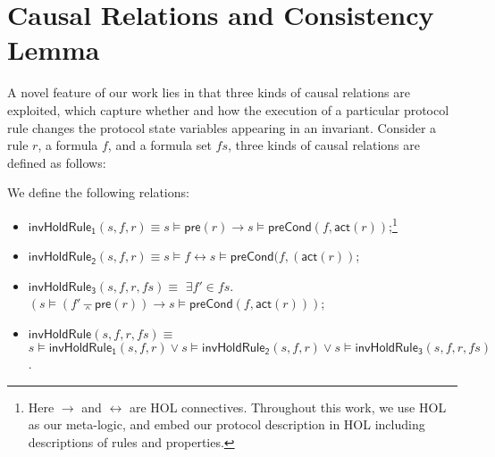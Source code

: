 \documentclass[conference]{IEEEtran}
\newlength{\fminilength}
\newenvironment{fmini}[1][\linewidth]
  {\setlength{\fminilength}{#1\fboxsep-2\fboxrule}%
   \vspace{2ex}\noindent\begin{lrbox}{\fminibox}\begin{minipage}{\fminilength}%
   \mbox{ }\hfill\vspace{-2.5ex}}%
  {\end{minipage}\end{lrbox}\vspace{1ex}\hspace{0ex}%
   \framebox{\usebox{\fminibox}}}
\newenvironment{specification}
{\noindent\scriptsize
\tt\begin{fmini}\begin{tabbing}X\=X12345\=XXXX\=XXXX\=XXXX\=XXXX\=XXXX
\=\+\kill} {\end{tabbing}\normalfont\end{fmini}}
\def \andc {\barwedge }
\begin{document}
{\vspace{-20pt}
\section{Causal Relations and Consistency Lemma} \label{sec:causal_rel}
\vspace{-5pt}
A novel feature of our work lies in that three kinds of causal
relations are exploited, which capture whether and how the execution of a particular protocol rule changes the protocol state variables appearing in an invariant.  Consider a rule $r$, a formula $f$, and a formula set $fs$, three
 kinds of causal relations are defined as follows:

\vspace{-5pt}
\begin{definition}
We define the following relations: %
\begin{itemize}%
\item $\mathsf{invHoldRule_1} (s,f,r) \equiv $$s \models \mathsf{pre}(r) \longrightarrow s \models \mathsf{preCond}(f ,\mathsf{act}(r))$;\footnote{Here  $\longrightarrow$ and $\longleftrightarrow$ are HOL connectives.  Throughout this work, we use HOL as our meta-logic, and embed our protocol description in HOL including descriptions of rules and properties.}
\item $\mathsf{invHoldRule_2}(s,f,r) \equiv  $$s \models f \longleftrightarrow s \models \mathsf{preCond}( f,(\mathsf{act}( r))$;
\item $\mathsf{invHoldRule_3}(s,f,r,fs) \equiv$  $\exists f' \in fs$.
$(s \models ( f' \andc \mathsf{pre}(r))  \longrightarrow s \models \mathsf{preCond}(f ,\mathsf{act}(r)))$;
\item $\mathsf{invHoldRule}(s,f,r, fs) \equiv$   $s \models\mathsf{invHoldRule_1}(s,f,r) \vee s\models\mathsf{invHoldRule_2}(s,f,r) \vee s\models \mathsf{invHoldRule_3}(s,f,r,fs)$.
\end{itemize}
\end{definition}
\vspace{-0.2cm}

}
\end{document}
